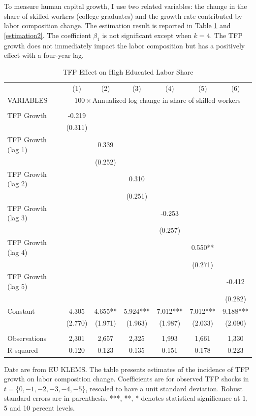 \documentclass[12pt]{article}
\begin{document}
To measure human capital growth, I use two related variables: the change in the share of skilled workers (college graduates) and the growth rate contributed by labor composition change. The estimation result is reported in Table \ref{estimation1} and \ref{estimation2}. The coefficient $\beta_{1}$ is not significant except when $k=4$. The TFP growth does not immediately impact the labor composition but has a positively effect with a four-year lag. 

\begin{table}[h!]
\begin{center}
\scriptsize
\begin{tabular}{lcccccc} \hline \hline
 & (1) & (2) & (3) & (4) & (5) & (6)\\
VARIABLES & \multicolumn{6}{c}{$100 \times$Annualized log change in share of skilled workers} \\ \hline
 &  &  &  &  &  &  \\
TFP Growth & -0.219 &  &  &  &  &  \\
 & (0.311) &  &  &  &  &  \\
TFP Growth (lag 1) &  & 0.339 &  &  &  &  \\
 &  & (0.252) &  &  &  &  \\
TFP Growth (lag 2) &  &  & 0.310 &  &  &  \\
 &  &  & (0.251) &  &  &  \\
TFP Growth (lag 3) &  &  &  & -0.253 &  &  \\
 &  &  &  & (0.257) &  &  \\
TFP Growth (lag 4) &  &  &  &  & 0.550** &  \\
 &  &  &  &  & (0.271) &  \\
TFP Growth (lag 5) &  &  &  &  &  & -0.412 \\
 &  &  &  &  &  & (0.282) \\
Constant & 4.305 & 4.655** & 5.924*** & 7.012*** & 7.012*** & 9.188*** \\
 & (2.770) & (1.971) & (1.963) & (1.987) & (2.033) & (2.090) \\
 &  &  &  &  &  &  \\
Observations & 2,301 & 2,657 & 2,325 & 1,993 & 1,661 & 1,330 \\
 R-squared & 0.120 & 0.123 & 0.135 & 0.151 & 0.178 & 0.223 \\ \hline
\end{tabular}
\end{center}
\caption{TFP Effect on High Educated Labor Share}
\label{estimation1}
{\scriptsize Date are from EU KLEMS. The table presents estimates of the incidence of TFP growth on labor composition change. Coefficients are for observed TFP shocks in $t = \{0,-1,-2,-3,-4,-5\}$, rescaled to have a unit standard deviation. Robust standard errors are in parenthesis. ***, **, * denotes statistical significance at 1, 5 and 10 percent levels.}
\end{table}
\end{document}

